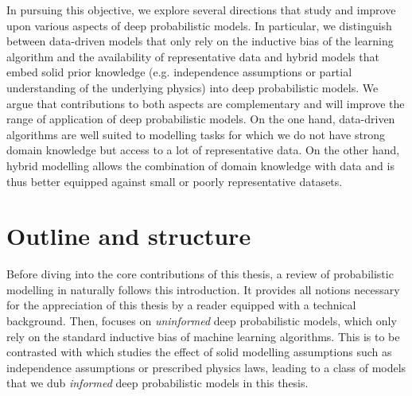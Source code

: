In pursuing this objective, we explore several directions that study and improve upon various aspects of deep probabilistic models. In particular, we distinguish between data-driven models that only rely on the inductive bias of the learning algorithm and the availability of representative data and hybrid models that embed solid prior knowledge (e.g. independence assumptions or partial understanding of the underlying physics) into deep probabilistic models. We argue that contributions to both aspects are complementary and will improve the range of application of deep probabilistic models. On the one hand, data-driven algorithms are well suited to modelling tasks for which we do not have strong domain knowledge but access to a lot of representative data. On the other hand, hybrid modelling allows the combination of domain knowledge with data and is thus better equipped against small or poorly representative datasets.





\section{Outline and structure}

Before diving into the core contributions of this thesis, a review of probabilistic modelling in  naturally follows this introduction. It provides all notions necessary for the appreciation of this thesis by a reader equipped with a technical background. Then,  focuses on \textit{uninformed} deep probabilistic models, which only rely on the standard inductive bias of machine learning algorithms. This is to be contrasted with  which studies the effect of solid modelling assumptions such as independence assumptions or prescribed physics laws, leading to a class of models that we dub \textit{informed} deep probabilistic models in this thesis.

